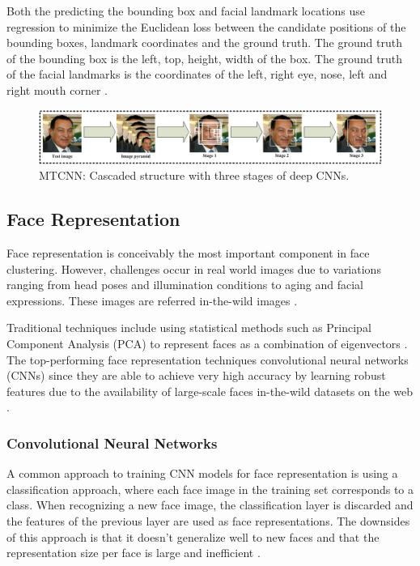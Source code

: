\documentclass[12pt,english]{article}
\begin{document}
Both the predicting the bounding box and facial landmark locations use regression to minimize the Euclidean loss between the candidate positions of the bounding boxes, landmark coordinates and the ground truth. The ground truth of the bounding box is the left, top, height, width of the box. The ground truth of the facial landmarks is the coordinates of the left, right eye, nose, left and right mouth corner \cite{zhang}.


\begin{figure}[!tbp]
 \centering
    \includegraphics[width=\columnwidth]{figures/mtcnn_pipeline2.png}
    \caption{MTCNN: Cascaded structure with three stages of deep CNNs. \cite{zhang}}
	\label{fig:mtcnn}
\end{figure}


\subsection{Face Representation}

\quad
Face representation is conceivably the most important component in face clustering. However, challenges occur in real world images due to variations ranging from head poses and illumination conditions to aging and facial expressions. These images are referred in-the-wild images \cite{trigueros}.

Traditional techniques include using statistical methods such as Principal Component Analysis (PCA) to represent faces as a combination of eigenvectors \cite{amos}. The top-performing face representation techniques convolutional neural networks (CNNs) \cite{amos} since they are able to achieve very high accuracy by learning robust features due to the availability of large-scale faces in-the-wild datasets on the web \cite{trigueros}.  

\subsubsection{Convolutional Neural Networks}
\quad
A common approach to training CNN models for face representation is using a classification approach, where each face image in the training set corresponds to a class. When recognizing a new face image, the classification layer is discarded and the features of the previous layer are used as face representations. The downsides of this approach is that it doesn't generalize well to new faces and that the representation size per face is large and inefficient \cite{schroff}.
\end{document}
